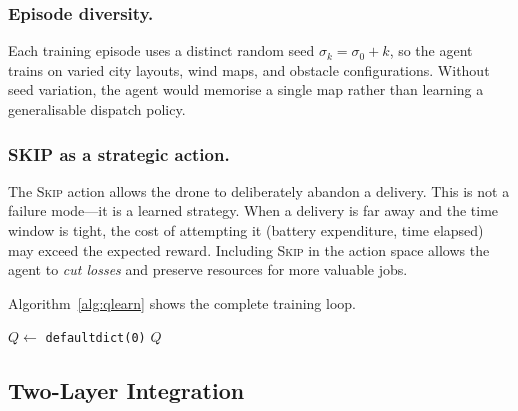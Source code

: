\documentclass[11pt,twocolumn]{article}
\begin{document}
\subsubsection{Episode diversity.}
Each training episode uses a distinct random seed
$\sigma_k = \sigma_0 + k$, so the agent trains on varied city layouts,
wind maps, and obstacle configurations.
Without seed variation, the agent would memorise a single map rather
than learning a generalisable dispatch policy.

\subsubsection{SKIP as a strategic action.}
The \textsc{Skip} action allows the drone to deliberately abandon a
delivery.
This is not a failure mode---it is a learned strategy.
When a delivery is far away and the time window is tight, the cost of
attempting it (battery expenditure, time elapsed) may exceed the expected
reward.
Including \textsc{Skip} in the action space allows the agent to
\emph{cut losses} and preserve resources for more valuable jobs.

Algorithm~\ref{alg:qlearn} shows the complete training loop.

\begin{algorithm}[H]
\small
\caption{Q-learning training loop}
\label{alg:qlearn}
\SetAlgoLined
{}
$Q \leftarrow$ \texttt{defaultdict(0)}\;
\Return $Q$\;
\end{algorithm}

\subsection{Two-Layer Integration}
\label{sec:integration}
\end{document}
